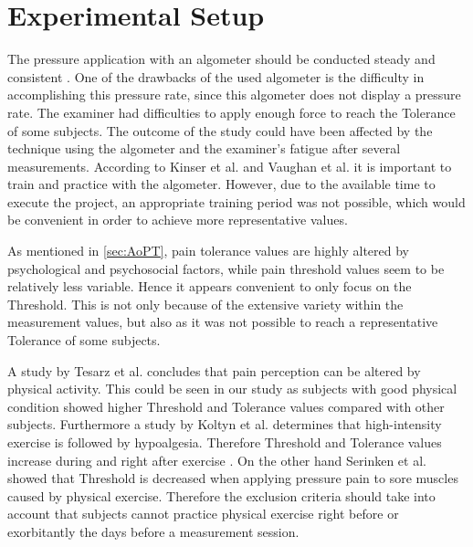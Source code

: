 \section{Experimental Setup}
The pressure application with an algometer should be conducted steady and consistent \cite{Fischer1987, Kinser2009}. One of the drawbacks of the used algometer is the difficulty in accomplishing this pressure rate, since this algometer does not display a pressure rate.
The examiner had difficulties to apply enough force to reach the Tolerance of some subjects. The outcome of the study could have been affected by the technique using the algometer and the examiner's fatigue after several measurements.  According to Kinser et al. \cite{Kinser2009} and Vaughan et al. \cite{Vaughan2007} it is important to train and practice with the algometer. However, due to the available time to execute the project, an appropriate training period was not possible, which would be convenient in order to achieve more representative values.

As mentioned in \autoref{sec:AoPT}, pain tolerance values are highly altered by psychological and psychosocial factors, while pain threshold values seem to be relatively less variable. Hence  it appears convenient to only focus on the Threshold.  This is not only because of the extensive variety within the measurement values, but also as it was not possible to reach a representative Tolerance of some subjects.

A study by Tesarz et al. \cite{Tesarz2012} concludes that pain perception can be altered by physical activity. This could be seen in our study as subjects with good physical condition showed higher Threshold and Tolerance values compared with other subjects. 
Furthermore a study by Koltyn et al. \cite{Koltyn2002} determines that high-intensity exercise is followed by hypoalgesia. Therefore Threshold and Tolerance values increase during and right after exercise  \cite{Koltyn2002}. On the other hand Serinken et al. \cite{Serinken2013} showed that Threshold is decreased when applying pressure pain to sore muscles caused by physical exercise. Therefore the exclusion criteria should take into account that subjects cannot practice physical exercise right before or exorbitantly the days before a measurement session.


